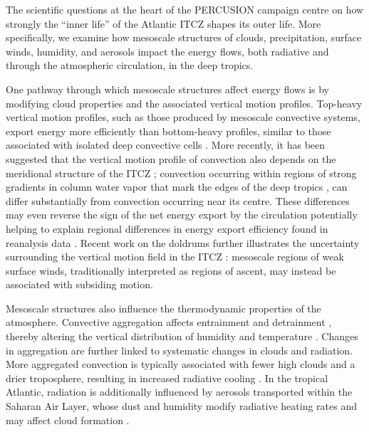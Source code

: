 \documentclass{article}
\begin{document}
The scientific questions at the heart of the PERCUSION campaign centre on how strongly the “inner life” of the Atlantic ITCZ \citep{windmillerInnerLifeAtlantic2024} shapes its outer life. 
More specifically, we examine how mesoscale structures of clouds, precipitation, surface winds, humidity, and aerosols impact the energy flows, both radiative and through the atmospheric circulation, in the deep tropics.

One pathway through which mesoscale structures affect energy flows is by modifying cloud properties and the associated vertical motion profiles. 
Top-heavy vertical motion profiles, such as those produced by mesoscale convective systems, export energy more efficiently than bottom-heavy profiles, similar to those associated with isolated deep convective cells \citep[e.g.,][]{Houze2004}. 
More recently, it has been suggested that the vertical motion profile of convection also depends on the meridional structure of the ITCZ \citep{masunagaEdgeIntensificationEastern2023}; convection occurring within regions of strong gradients in column water vapor that mark the edges of the deep tropics
\citep{Mapes2018, masunagaMechanismMaintenanceSharp2020}, can differ substantially from convection occurring near its centre. 
These differences may even reverse the sign of the net energy export by the circulation potentially helping to explain regional differences in energy export efficiency found in reanalysis data \citep{backGeographicVariabilityExport2006}. 
Recent work on the doldrums further illustrates the uncertainty surrounding the vertical motion field in the ITCZ \citep{windmillerCalmVariableInner2024}: mesoscale regions of weak surface winds, traditionally interpreted as regions of ascent, may instead be associated with subsiding motion.

Mesoscale structures also influence the thermodynamic properties of the atmosphere. Convective aggregation affects entrainment and detrainment \citep{beckerEstimatingBulkEntrainment2018}, thereby altering the vertical distribution of humidity and temperature \citep[e.g.,][]{singhInfluenceEntrainmentThermal2013}. 
Changes in aggregation are further linked to systematic changes in clouds and radiation. 
More aggregated convection is typically associated with fewer high clouds and a drier troposphere, resulting in increased radiative cooling \citep[e.g.,][]{Tobin2012, bonyObservedModulationTropical2020}. In the tropical Atlantic, radiation is additionally influenced by aerosols transported within the Saharan Air Layer, whose dust and humidity modify radiative heating rates and may affect cloud formation \citep{gutlebenImpactsWaterVapor2019}.
\end{document}
